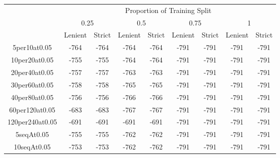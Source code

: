 \documentclass[12pt]{article}
\begin{document}
\begin{table}[h!]
    \begin{tabular}{|c|cc|cc|cc|cc|}
        \hline
                        & \multicolumn{8}{c|}{Proportion of Training Split}                                                                              \\
                        & \multicolumn{2}{c}{0.25}      & \multicolumn{2}{c}{0.5}       & \multicolumn{2}{c}{0.75}      & \multicolumn{2}{c|}{1}         \\
                        & \multicolumn{1}{c}{Lenient} & \multicolumn{1}{c}{Strict} & \multicolumn{1}{c}{Lenient} & \multicolumn{1}{c}{Strict} & \multicolumn{1}{c}{Lenient} & \multicolumn{1}{c}{Strict} & \multicolumn{1}{c}{Lenient} & \multicolumn{1}{c|}{Strict} \\ \hline
        5per10at0.05    & -764          & -764          & -764          & -764          & -791          & -791          & -791          & -791          \\
        10per20at0.05   & -755          & -755          & -764          & -764          & -791          & -791          & -791          & -791          \\
        20per40at0.05   & -757          & -757          & -763          & -763          & -791          & -791          & -791          & -791          \\
        30per60at0.05   & -758          & -758          & -765          & -765          & -791          & -791          & -791          & -791          \\
        40per80at0.05   & -756          & -756          & -766          & -766          & -791          & -791          & -791          & -791          \\
        60per120at0.05  & -683          & -683          & -767          & -767          & -791          & -791          & -791          & -791          \\
        120per240at0.05 & -691          & -691          & -691          & -691          & -791          & -791          & -791          & -791          \\ \hline
        5seqAt0.05      & -755          & -755          & -762          & -762          & -791          & -791          & -791          & -791          \\
        10seqAt0.05     & -753          & -753          & -762          & -762          & -791          & -791          & -791          & -791          \\

\end{tabular}
\end{table}
\end{document}
